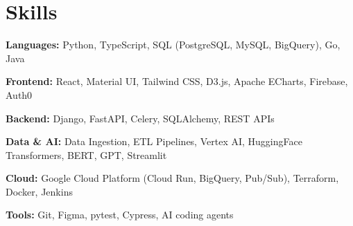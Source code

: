\documentclass[11pt]{article}
\begin{document}

\section*{Skills}

\textbf{Languages:} Python, TypeScript, SQL (PostgreSQL, MySQL, BigQuery), Go, Java

\textbf{Frontend:} React, Material UI, Tailwind CSS, D3.js, Apache ECharts, Firebase, Auth0

\textbf{Backend:} Django, FastAPI, Celery, SQLAlchemy, REST APIs

\textbf{Data \& AI:} Data Ingestion, ETL Pipelines, Vertex AI, HuggingFace Transformers, BERT, GPT, Streamlit

\textbf{Cloud:} Google Cloud Platform (Cloud Run, BigQuery, Pub/Sub), Terraform, Docker, Jenkins

\textbf{Tools:} Git, Figma, pytest, Cypress, AI coding agents

\vspace{-8pt}
\end{document}
